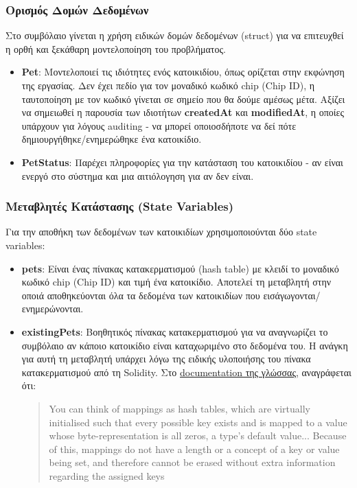 \documentclass[12pt,a4paper]{article}
\begin{document}
\subsubsection{Ορισμός Δομών Δεδομένων}
Στο συμβόλαιο γίνεται η χρήση ειδικών δομών δεδομένων (struct) για να επιτευχθεί η ορθή και ξεκάθαρη μοντελοποίηση του προβλήματος.

\begin{itemize}
    \item \textbf{Pet}: Μοντελοποιεί τις ιδιότητες ενός κατοικιδίου, όπως ορίζεται στην εκφώνηση της εργασίας. Δεν έχει πεδίο για τον μοναδικό κωδικό chip (Chip ID), η ταυτοποίηση με τον κωδικό γίνεται σε σημείο που θα δούμε αμέσως μέτα. Αξίζει να σημειωθεί η παρουσία των ιδιοτήτων \textbf{createdAt} και \textbf{modifiedAt}, η οποίες υπάρχουν για λόγους auditing - να μπορεί οποιοσδήποτε να δεί πότε δημιουργήθηκε/ενημερώθηκε ένα κατοικίδιο.
    
    \item \textbf{PetStatus}: Παρέχει πληροφορίες για την κατάσταση του κατοικιδίου - αν είναι ενεργό στο σύστημα και μια αιτιόλογηση για αν δεν είναι.
\end{itemize}

\subsubsection{Μεταβλητές Κατάστασης (State Variables)}
Για την αποθήκη των δεδομένων των κατοικιδίων χρησιμοποιούνται δύο state variables:

\begin{itemize}
    \item \textbf{pets}: Είναι ένας πίνακας κατακερματισμού (hash table) με κλειδί το μοναδικό κωδικό chip (Chip ID) και τιμή ένα κατοικίδιο. Αποτελεί τη μεταβλητή στην οποιά αποθηκεύονται όλα τα δεδομένα των κατοικιδίων που εισάγωγονται/ενημερώνονται.\
    \item \textbf{existingPets}: Βοηθητικός πίνακας κατακερματισμού για να αναγνωρίζει το συμβόλαιο αν κάποιο κατοικίδιο είναι καταχωριμένο στο δεδομένα του. Η ανάγκη για αυτή τη μεταβλητή υπάρχει λόγω της ειδικής υλοποιήσης του πίνακα κατακερματισμού από τη Solidity. Στο  \href{https://docs.soliditylang.org/en/v0.8.30/types.html#mapping-types}{documentation της γλώσσας}, αναγράφεται ότι: \begin{quote}
        You can think of mappings as hash tables, which are virtually initialised such that every possible key exists and is mapped to a value whose byte-representation is all zeros, a type’s default value... Because of this, mappings do not have a length or a concept of a key or value being set, and therefore cannot be erased without extra information regarding the assigned keys
    \end{quote}
\end{itemize}
\end{document}
